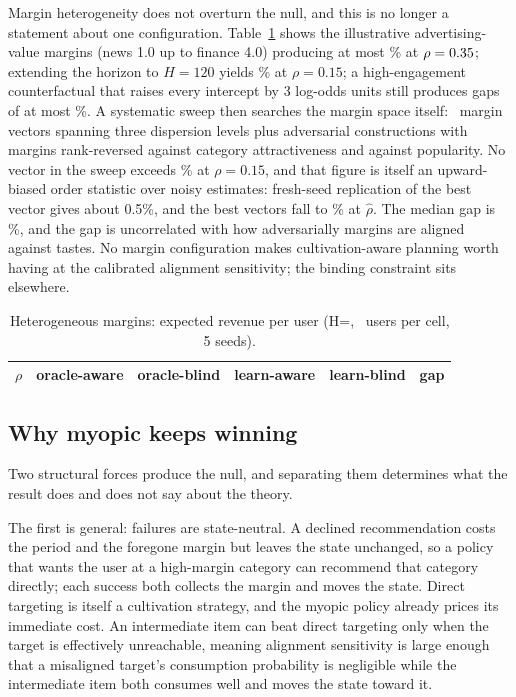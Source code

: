 \documentclass[11pt]{article}
\begin{document}
Margin heterogeneity does not overturn the null, and this is no longer a
statement about one configuration. Table~\ref{tab:simhet} shows the
illustrative advertising-value margins (news 1.0 up to finance 4.0)
producing at most \hgapmaxpct\% at $\rho=0.35$; extending the horizon to
$H=120$ yields \hsweepgap\% at $\rho=0.15$; a high-engagement counterfactual
that raises every intercept by 3 log-odds units still produces gaps of at
most \egapmaxpct\%. A systematic sweep then searches the margin space
itself: \nmarginvec\ margin vectors spanning three dispersion levels plus
adversarial constructions with margins rank-reversed against category
attractiveness and against popularity. No vector in the sweep exceeds
\margingapmax\% at $\rho=0.15$, and that figure is itself an upward-biased
order statistic over noisy estimates: fresh-seed replication of the best
vector gives about 0.5\%, and the best vectors fall to
\margingapmaxrhohat\% at $\hat\rho$. The median gap is \margingapmed\%,
and the gap is uncorrelated with how adversarially margins are aligned
against tastes. No margin configuration
makes cultivation-aware planning worth having at the calibrated alignment
sensitivity; the binding constraint sits elsewhere.

\begin{table}[ht]
\centering
\caption{Heterogeneous margins: expected revenue per user (H=\simH, \simEp\
users per cell, 5 seeds).}
\label{tab:simhet}
\begin{tabular}{rrrrrr}
\toprule
$\rho$ & oracle-aware & oracle-blind & learn-aware & learn-blind & gap \\
\midrule

\end{tabular}
\end{table}

\subsection{Why myopic keeps winning}

Two structural forces produce the null, and separating them determines what
the result does and does not say about the theory.

The first is general: failures are state-neutral. A declined recommendation
costs the period and the foregone margin but leaves the state unchanged, so
a policy that wants the user at a high-margin category can recommend that
category directly; each success both collects the margin and moves the
state. Direct targeting is itself a cultivation strategy, and the myopic
policy already prices its immediate cost. An intermediate item can beat
direct targeting only when the target is effectively unreachable, meaning
alignment sensitivity is large enough that a misaligned target's
consumption probability is negligible while the intermediate item both
consumes well and moves the state toward it.
\end{document}

